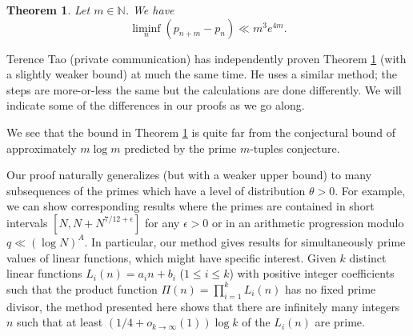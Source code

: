 \documentclass[12pt,a4paper]{amsart}
\theoremstyle{plain}
\newtheorem{thrm}{Theorem}[section]
\numberwithin{sblmm}{thrm}
\numberwithin{equation}{section}
\begin{document}
\begin{thrm}\label{thrm:ManyPrimes}
Let $m\in\mathbb{N}$. We have
\[\liminf_{n}(p_{n+m}-p_n)\ll m^3 e^{4m}.\]
\end{thrm}
Terence Tao (private communication) has independently proven Theorem \ref{thrm:ManyPrimes} (with a slightly weaker bound) at much the same time. He uses a similar method; the steps are more-or-less the same but the calculations are done differently. We will indicate some of the differences in our proofs as we go along.

We see that the bound in Theorem \ref{thrm:ManyPrimes} is quite far from the conjectural bound of approximately $m\log{m}$ predicted by the prime $m$-tuples conjecture.

Our proof naturally generalizes (but with a weaker upper bound) to many subsequences of the primes which have a level of distribution $\theta>0$. For example, we can show corresponding results where the primes are contained in short intervals $[N,N+N^{7/12+\epsilon}]$ for any $\epsilon>0$ or in an arithmetic progression modulo $q\ll (\log{N})^A$. In particular, our method gives results for simultaneously prime values of linear functions, which might have specific interest. Given $k$ distinct linear functions $L_i(n)=a_in+b_i$ ($1\le i\le k$) with positive integer coefficients such that the product function $\Pi(n)=\prod_{i=1}^kL_i(n)$ has no fixed prime divisor, the method presented here shows that there are infinitely many integers $n$ such that at least $(1/4+o_{k\rightarrow\infty}(1))\log{k}$ of the $L_i(n)$ are prime.
\end{document}

